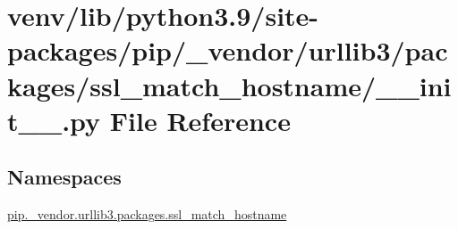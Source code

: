 \hypertarget{venv_2lib_2python3_89_2site-packages_2pip_2__vendor_2urllib3_2packages_2ssl__match__hostname_2____init_____8py}{}\section{venv/lib/python3.9/site-\/packages/pip/\+\_\+vendor/urllib3/packages/ssl\+\_\+match\+\_\+hostname/\+\_\+\+\_\+init\+\_\+\+\_\+.py File Reference}
\label{venv_2lib_2python3_89_2site-packages_2pip_2__vendor_2urllib3_2packages_2ssl__match__hostname_2____init_____8py}
\subsection*{Namespaces}
\begin{DoxyCompactItemize}
\item 
 \hyperlink{namespacepip_1_1__vendor_1_1urllib3_1_1packages_1_1ssl__match__hostname}{pip.\+\_\+vendor.\+urllib3.\+packages.\+ssl\+\_\+match\+\_\+hostname}
\end{DoxyCompactItemize}
